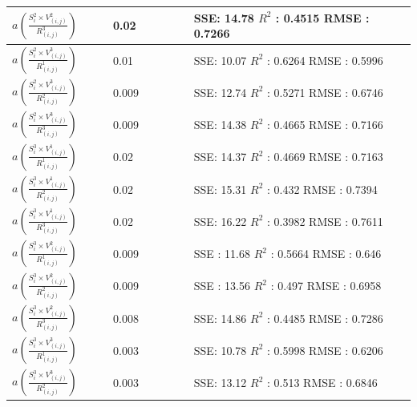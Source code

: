 \documentclass[conference]{IEEEtran}
\begin{document}
\begin{center}
\begin{table}[htbp]
\begin{center}
\begin{adjustbox}{width=0.5\textwidth}
\begin{tabular}{|p{0.25\linewidth}|p{0.2\linewidth}|p{0.55\linewidth}|}
\hline
$a(  \frac{S_{i}^2 \times V_{(i,j)}^2}{R_{(i,j)}^3})$ & 0.02 & SSE: 14.78  $R^2$ : 0.4515  RMSE : 0.7266 \\
\hline
 $a(  \frac{S_{i}^2 \times V_{(i,j)}^3}{R_{(i,j)}^1})$ &  0.01 &  SSE: 10.07  $R^2$ : 0.6264  RMSE : 0.5996 \\
\hline
 $a(  \frac{S_{i}^2 \times V_{(i,j)}^3}{R_{(i,j)}^2})$ & 0.009 & SSE: 12.74  $R^2$ : 0.5271  RMSE : 0.6746 \\
\hline
 $a(  \frac{S_{i}^2 \times V_{(i,j)}^3}{R_{(i,j)}^3})$ & 0.009 & SSE: 14.38  $R^2$ : 0.4665  RMSE : 0.7166\\
\hline
 $a(  \frac{S_{i}^3 \times V_{(i,j)}^1}{R_{(i,j)}^1})$ & 0.02 & SSE: 14.37  $R^2$ : 0.4669  RMSE : 0.7163 \\
\hline
 $a(  \frac{S_{i}^3 \times V_{(i,j)}^1}{R_{(i,j)}^2})$ & 0.02 & SSE: 15.31  $R^2$ : 0.432  RMSE : 0.7394 \\
\hline
 $a(  \frac{S_{i}^3 \times V_{(i,j)}^1}{R_{(i,j)}^3})$ & 0.02 & SSE: 16.22  $R^2$ : 0.3982  RMSE : 0.7611 \\
\hline
$a(  \frac{S_{i}^3 \times V_{(i,j)}^2}{R_{(i,j)}^1})$ & 0.009 & SSE : 11.68  $R^2$ : 0.5664  RMSE : 0.646 \\
\hline
$a(  \frac{S_{i}^3 \times V_{(i,j)}^2}{R_{(i,j)}^2})$ & 0.009 & SSE : 13.56  $R^2$ : 0.497  RMSE : 0.6958\\
\hline
 $a(  \frac{S_{i}^3 \times V_{(i,j)}^2}{R_{(i,j)}^3})$ & 0.008 & SSE: 14.86 $R^2$ : 0.4485  RMSE : 0.7286 \\
\hline
 $a(  \frac{S_{i}^3 \times V_{(i,j)}^3}{R_{(i,j)}^1})$ & 0.003 & SSE: 10.78  $R^2$ : 0.5998  RMSE : 0.6206 \\
\hline
$a(  \frac{S_{i}^3 \times V_{(i,j)}^3}{R_{(i,j)}^2})$ & 0.003 & SSE: 13.12  $R^2$ : 0.513  RMSE : 0.6846 \\
\hline
\end{tabular}
\end{adjustbox}
\end{center}
\end{table}
\end{center} 
\end{document}
